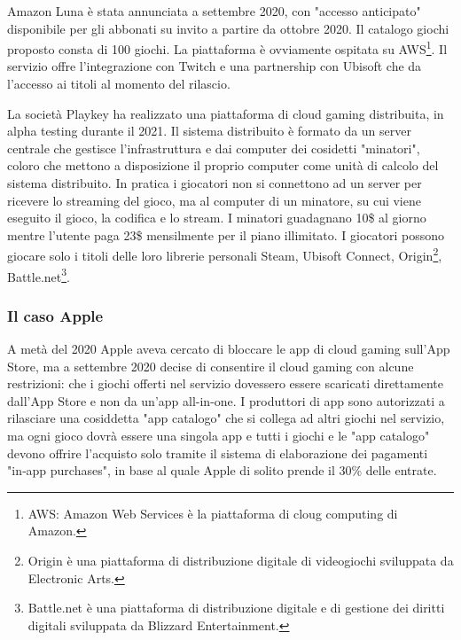 Amazon Luna è stata annunciata a settembre 2020, con "accesso anticipato" disponibile per gli abbonati su invito a partire da ottobre 2020. Il catalogo giochi proposto consta di 100 giochi. La piattaforma è ovviamente ospitata su AWS\footnote{AWS: Amazon Web Services è la piattaforma di cloug computing di Amazon.}. Il servizio offre l'integrazione con Twitch e una partnership con Ubisoft che da l'accesso ai titoli al momento del rilascio\cite{Amazon_Luna}.

La società Playkey ha realizzato una piattaforma di cloud gaming distribuita, in alpha testing durante il 2021. Il sistema distribuito è formato da un server centrale che gestisce l'infrastruttura e dai computer dei cosidetti "minatori", coloro che mettono a disposizione il proprio computer come unità di calcolo del sistema distribuito. In pratica i giocatori non si connettono ad un server per ricevere lo streaming del gioco, ma al computer di un minatore, su cui viene eseguito il gioco, la codifica e lo stream. I minatori guadagnano 10\$ al giorno mentre l'utente paga 23\$ mensilmente per il piano illimitato. I giocatori possono giocare solo i titoli delle loro librerie personali Steam, Ubisoft Connect, Origin\footnote{Origin è una piattaforma di distribuzione digitale di videogiochi sviluppata da Electronic Arts.}, Battle.net\footnote{Battle.net è una piattaforma di distribuzione digitale e di gestione dei diritti digitali sviluppata da Blizzard Entertainment.}\cite{Playkey}.


\subsubsection{Il caso Apple}
A metà del 2020 Apple aveva cercato di bloccare le app di cloud gaming sull'App Store, ma a settembre 2020 decise di consentire il cloud gaming con alcune restrizioni: che i giochi offerti nel servizio dovessero essere scaricati direttamente dall'App Store e non da un'app all-in-one. I produttori di app sono autorizzati a rilasciare una cosiddetta "app catalogo" che si collega ad altri giochi nel servizio, ma ogni gioco dovrà essere una singola app e tutti i giochi e le "app catalogo" devono offrire l'acquisto solo tramite il sistema di elaborazione dei pagamenti "in‑app purchases", in base al quale Apple di solito prende il 30\% delle entrate\cite{Apple_controversy}.